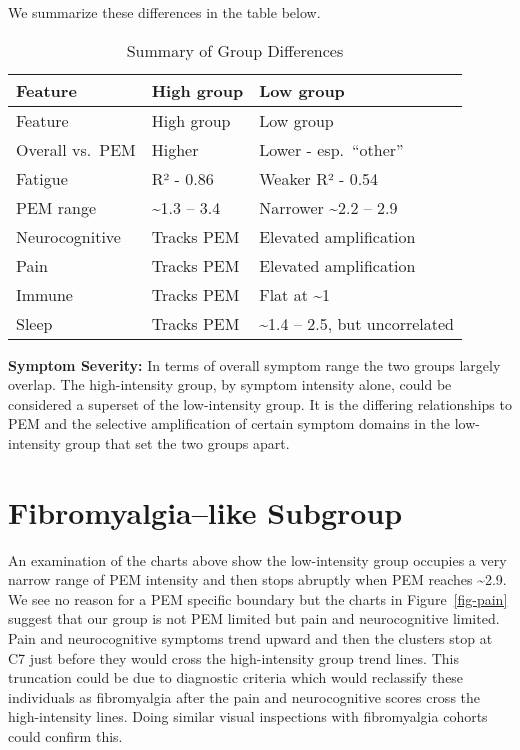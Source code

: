 \documentclass[
  letterpaper,
  DIV=11,
  numbers=noendperiod]{scrartcl}
\begin{document}
We summarize these differences in the table below.\bigskip

\begin{longtable}[]{@{}lll@{}}
\caption{Summary of Group Differences}\label{tbl-t1}\tabularnewline
\toprule\noalign{}
Feature & High group & Low group \\
\midrule\noalign{}
\endfirsthead
\toprule\noalign{}
Feature & High group & Low group \\
\midrule\noalign{}
\endhead
\bottomrule\noalign{}
\endlastfoot
Overall vs.~PEM & Higher & Lower - esp.~``other'' \\
Fatigue & R² - 0.86 & Weaker R² - 0.54 \\
PEM range & \textasciitilde1.3 -- 3.4 & Narrower \textasciitilde2.2 --
2.9 \\
Neurocognitive & Tracks PEM & Elevated amplification \\
Pain & Tracks PEM & Elevated amplification \\
Immune & Tracks PEM & Flat at \textasciitilde1 \\
Sleep & Tracks PEM & \textasciitilde1.4 -- 2.5, but uncorrelated \\
\end{longtable}

\bigskip

\textbf{Symptom Severity:} In terms of overall symptom range the two
groups largely overlap. The high-intensity group, by symptom intensity
alone, could be considered a superset of the low-intensity group. It is
the differing relationships to PEM and the selective amplification of
certain symptom domains in the low-intensity group that set the two
groups apart.

\section{Fibromyalgia--like Subgroup}\label{sec-fibro}

An examination of the charts above show the low-intensity group occupies
a very narrow range of PEM intensity and then stops abruptly when PEM
reaches \textasciitilde2.9. We see no reason for a PEM specific boundary
but the charts in Figure~\ref{fig-pain} suggest that our group is not
PEM limited but pain and neurocognitive limited. Pain and neurocognitive
symptoms trend upward and then the clusters stop at C7 just before they
would cross the high-intensity group trend lines. This truncation could
be due to diagnostic criteria which would reclassify these individuals
as fibromyalgia after the pain and neurocognitive scores cross the
high-intensity lines. Doing similar visual inspections with fibromyalgia
cohorts could confirm this.
\end{document}
